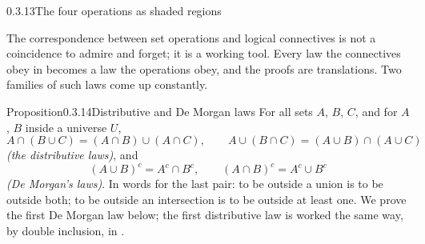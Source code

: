\documentclass[main.tex]{subfiles}
\begin{document}
\begin{Fig}{0.3.13}{The four operations as shaded regions}
\end{Fig}

\noindent The correspondence between set operations and logical connectives is not a coincidence to
admire and forget; it is a working tool. Every law the connectives obey in  becomes a law
the operations obey, and the proofs are translations. Two families of such laws come up constantly.

\begin{Obj}{Proposition}{0.3.14}{Distributive and De Morgan laws}
For all sets $A$, $B$, $C$, and for $A$, $B$ inside a universe $U$,
\[
A\cap(B\cup C)=(A\cap B)\cup(A\cap C),\qquad A\cup(B\cap C)=(A\cup B)\cap(A\cup C)
\]
\emph{(the distributive laws)}, and
\[
(A\cup B)^{c}=A^{c}\cap B^{c},\qquad (A\cap B)^{c}=A^{c}\cup B^{c}
\]
\emph{(De Morgan's laws)}. In words for the last pair: to be outside a union is to be outside both; to
be outside an intersection is to be outside at least one. We prove the first De Morgan law below; the
first distributive law is worked the same way, by double inclusion, in .
\end{Obj}
\end{document}
